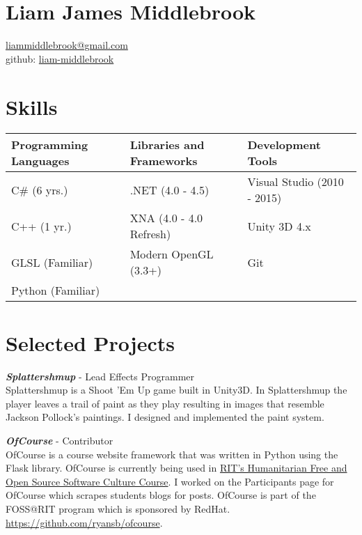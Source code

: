 \documentclass[line,margin]{res}
\begin{document}
\marginsize{.5in}{.5in}{.5in}{.5in}

\section{Liam James Middlebrook}

\href{mailto:liammiddlebrook@gmail.com}{liammiddlebrook@gmail.com}\\
github: \href{https://github.com/liam-middlebrook}{liam-middlebrook}

\begin{resume}


\section{Skills}
\begin{table}[h]
\begin{tabular}{@{}lll@{}}
\toprule
Programming Languages & Libraries and Frameworks & Development Tools           \\ \midrule
C\# (6 yrs.)          & .NET (4.0 - 4.5)         & Visual Studio (2010 - 2015) \\
C++ (1 yr.)           & XNA (4.0 - 4.0 Refresh)  & Unity 3D 4.x                \\
GLSL (Familiar)       & Modern OpenGL (3.3+)     & Git                         \\
Python (Familiar)     &                          &                             \\ \bottomrule
\end{tabular}
\end{table}


\section{Selected Projects}

{\textbf{\emph{Splattershmup}}} - Lead Effects Programmer\\
Splattershmup is a Shoot 'Em Up game built in Unity3D. In Splattershmup the player leaves
a trail of paint as they play resulting in images that resemble Jackson Pollock's paintings.
I designed and implemented the paint system.

{\textbf{\emph{OfCourse}}} - Contributor\\
OfCourse is a course website framework that was written in Python using the Flask library.
OfCourse is currently being used in \href{http://hfoss-fossrit.rhcloud.com}{RIT's Humanitarian
Free and Open Source Software Culture Course}. I worked on the Participants page for OfCourse
which scrapes students blogs for posts. OfCourse is part of the FOSS@RIT
program which is sponsored by RedHat.\\
\url{https://github.com/ryansb/ofcourse}.


\end{resume}
\end{document}
